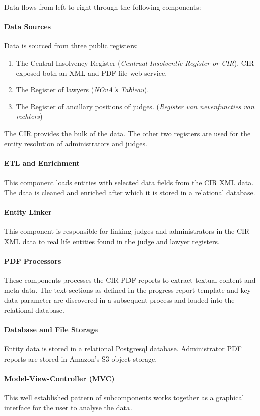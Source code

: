Data flows from left to right through the following components:

\paragraph{Data Sources} Data is sourced from three public registers:
\begin{enumerate}
	\item The Central Insolvency Register (\textit{Centraal Insolventie Register or CIR}). CIR exposed both an XML and PDF file web service.
	\item The Register of lawyers (\textit{NOvA's Tableau}).
	\item The Register of ancillary positions of judges. (\textit{Register van nevenfuncties van rechters}) 
\end{enumerate}

The CIR provides the bulk of the data. The other two registers are used for the entity resolution of administrators and judges.

\paragraph{ETL and Enrichment} This component loads entities with selected data fields from the CIR XML data. The data is cleaned and enriched after which it is stored in a relational database.

\paragraph{Entity Linker} This component is responsible for linking judges and administrators in the CIR XML data to real life entities found in the judge and lawyer registers. 

\paragraph{PDF Processors}
These components processes the CIR PDF reports to extract textual content and meta data. The text sections as defined in the progress report template and key data parameter are discovered in a subsequent process and loaded into the relational database.

\paragraph{Database and File Storage}
Entity data is stored in a relational Postgresql database. Administrator PDF reports are stored in Amazon's S3 object storage.

\paragraph{Model-View-Controller (MVC)}
This well established pattern of subcomponents works together as a graphical interface for the user to analyse the data. 
